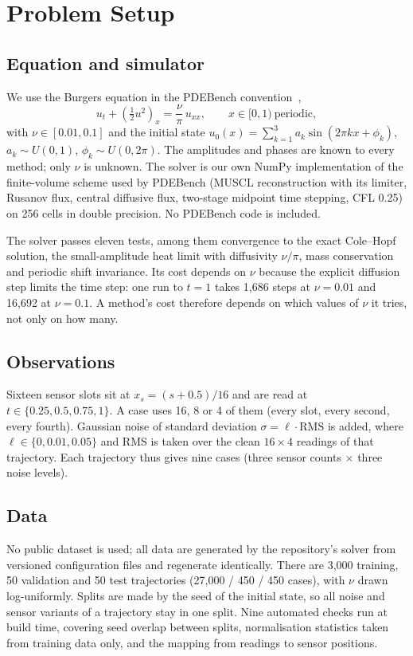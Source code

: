 \section{Problem Setup}
\subsection{Equation and simulator}
We use the Burgers equation in the PDEBench convention~\cite{takamoto2022}, %
\begin{equation}
u_t + \left(\tfrac{1}{2}u^2\right)_x = \frac{\nu}{\pi}\,u_{xx}, \qquad x\in[0,1)\ \text{periodic},
\end{equation}
with $\nu\in[0.01,0.1]$ and the initial state
$u_0(x)=\sum_{k=1}^{3} a_k \sin(2\pi k x+\phi_k)$, $a_k\sim U(0,1)$, $\phi_k\sim U(0,2\pi)$. The amplitudes and
phases are known to every method; only $\nu$ is unknown. The solver is our own NumPy implementation of the
finite-volume scheme used by PDEBench (MUSCL reconstruction with its limiter, Rusanov flux, central
diffusive flux, two-stage midpoint time stepping, CFL 0.25) on 256 cells in double precision. No PDEBench
code is included.

The solver passes eleven tests, %
among them convergence to the exact Cole--Hopf solution, the small-amplitude heat limit with diffusivity
$\nu/\pi$, mass conservation and periodic shift invariance. Its cost depends on $\nu$ because the explicit
diffusion step limits the time step: one run to $t=1$ takes 1{,}686 steps at $\nu=0.01$ and 16{,}692 at
$\nu=0.1$. %
A method's cost therefore depends on which values of $\nu$ it tries, not only on how many.

\subsection{Observations}
Sixteen sensor slots sit at $x_s=(s+0.5)/16$ and are read at $t\in\{0.25,0.5,0.75,1\}$. A case uses 16, 8 or
4 of them (every slot, every second, every fourth). Gaussian noise of standard deviation
$\sigma=\ell\cdot\mathrm{RMS}$ is added, where $\ell\in\{0,0.01,0.05\}$ and RMS is taken over the clean
$16\times4$ readings of that trajectory. %
Each trajectory thus gives nine cases (three sensor counts $\times$ three noise levels).

\subsection{Data}
No public dataset is used; all data are generated by the repository's solver from versioned configuration
files and regenerate identically. %
There are 3{,}000 training, 50 validation and 50 test trajectories (27{,}000 / 450 / 450 cases), with $\nu$
drawn log-uniformly. Splits are made by the seed of the initial state, so all noise and sensor variants of a
trajectory stay in one split. Nine automated checks run at build time, covering seed overlap between splits,
normalisation statistics taken from training data only, and the mapping from readings to sensor positions.


